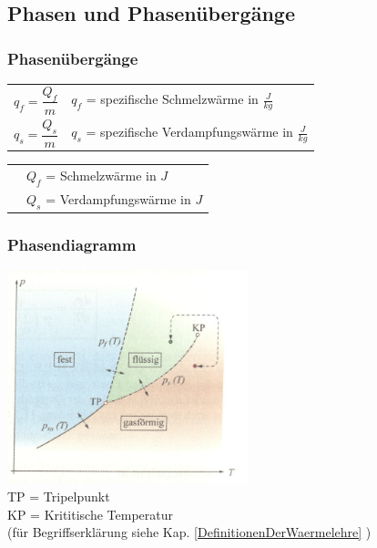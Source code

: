 	\subsection{Phasen und Phasenübergänge}
		\begin{minipage}[t]{13cm}
			\subsubsection{Phasenübergänge}
			\renewcommand{\arraystretch}{2.5}
			\begin{tabular}{ p{4cm} | p{7cm}}
				$q_f = \dfrac{Q_f}{m}$	&	$q_f$ = spezifische Schmelzwärme in $\frac{J}{kg}$\\
				$q_s = \dfrac{Q_s}{m}$	&	$q_s$ = spezifische Verdampfungswärme in $\frac{J}{kg}$\\
			\end{tabular}
			\renewcommand{\arraystretch}{1.5}
			\begin{tabular}{ p{4cm} | p{7cm} }
				& $Q_f$ = Schmelzwärme in $J$\\
				& $Q_s$ = Verdampfungswärme in $J$\\
			\end{tabular} 
			\renewcommand{\arraystretch}{1}
		\end{minipage}
		\newline
		\newline
		\newline
		\begin{minipage}[t]{9cm}
			\subsubsection{Phasendiagramm}
			\vspace{0.5cm}
			\vspace{-\ht\strutbox}\includegraphics[width=7cm]{./bilder/Phasendiagramm.png} \\
			TP = Tripelpunkt\\
			KP = Krititische Temperatur\\
			(für Begriffserklärung siehe Kap. \ref{DefinitionenDerWaermelehre} )
		\end{minipage}
